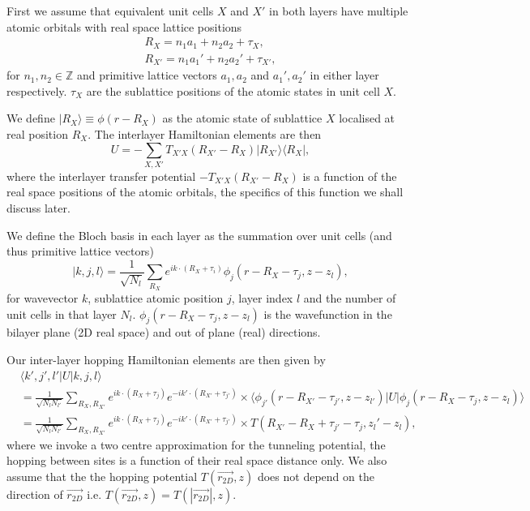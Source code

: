 \documentclass[12pt]{report} %
\begin{document}
  First we assume that equivalent unit cells $X$ and $X'$ in both layers have multiple atomic orbitals with real space lattice positions
  \begin{equation}
    \begin{gathered}
    R_X = n_1 a_1 + n_2 a_2 + \tau_X,\\
    R_{X'} = n_1 a_1' + n_2 a_2' + \tau_{X'},
    \end{gathered}
    \label{inter-layer_real_sublattice_positions}
  \end{equation}
%
  for $n_1, n_2 \in \mathbb{Z}$ and primitive lattice vectors $a_1, a_2$ and $a_1', a_2'$ in either layer respectively. $\tau_X$ are the sublattice positions of the atomic states in unit cell $X$.

  We define $| R_X \rangle \equiv \phi(r - R_X)$ as the atomic state of sublattice $X$ localised at real position $R_X$. The interlayer Hamiltonian elements are then
  \begin{equation}
    U = -\sum_{X, X'} T_{X'X}(R_{X'} - R_X) |R_{X'}\rangle \langle R_X|,
    \label{inter-layer_hamiltonian_elements}
  \end{equation}
%
  where the interlayer transfer potential $-T_{X'X}(R_{X'} - R_X)$ is a function of the real space positions of the atomic orbitals, the specifics of this function we shall discuss later.

  We define the Bloch basis in each layer as the summation over unit cells (and thus primitive lattice vectors)
  \begin{equation}
    | k,j,l \rangle = \frac{1}{\sqrt{N_l}}\sum_{R_X}e^{ik\cdot(R_X+\tau_i)}\phi_j(r-R_X-\tau_j, z-z_l),
    \label{inter-layer_real_bloch_basis}
  \end{equation}
%
  for wavevector $k$, sublattice atomic position $j$, layer index $l$ and the number of unit cells in that layer $N_l$. $\phi_j (r - R_X - \tau_j, z-z_l)$ is the wavefunction in the bilayer plane (2D real space) and out of plane (real) directions.

  Our inter-layer hopping Hamiltonian elements are then given by
  \begin{equation}
  \begin{aligned}
    &\langle k',j',l' | U | k, j, l \rangle\\
    &= \frac{1}{\sqrt{N_l N_{l'}}} \sum_{R_X, R_{X'}} e^{ik \cdot (R_X+\tau_j)} e^{-ik' \cdot (R_{X'} + \tau_{j'})} \times \langle \phi_{j'}(r - R_{X'} - \tau_{j'}, z - z_{l'}) | U | \phi_j (r - R_X - \tau_j, z - z_l) \rangle\\
    &=\frac{1}{\sqrt{N_l N_{l'}}} \sum_{R_X, R_{X'}} e^{ik \cdot (R_X+\tau_j)} e^{-ik' \cdot (R_{X'} + \tau_{j'})} \times T(R_{X'}-R_X +\tau_{j'} - \tau_j, z_l' - z_l),
    \label{}
  \end{aligned}
  \end{equation}
%
  where we invoke a two centre approximation for the tunneling potential, the hopping between sites is a function of their real space distance only. We also assume that the the hopping potential $T(\vec{r_{2D}}, z)$ does not depend on the direction of $\vec{r_{2D}}$ i.e. $T(\vec{r_{2D}}, z) = T(|\vec{r_{2D}}|, z)$.
\end{document}
